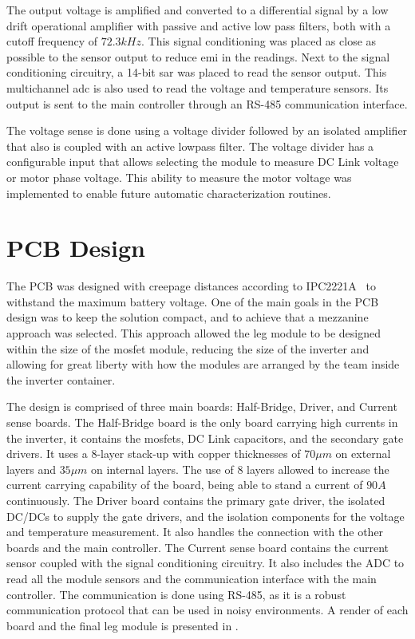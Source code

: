 The output voltage is amplified and converted to a differential signal by a low drift operational amplifier with passive and active low pass filters, both with a cutoff frequency of $72.3kHz$. This signal conditioning was placed as close as possible to the sensor output to reduce \gls{emi} in the readings. Next to the signal conditioning circuitry, a 14-bit \gls{sar} was placed to read the sensor output. This multichannel \gls{adc} is also used to read the voltage and temperature sensors. Its output is sent to the main controller through an RS-485 communication interface.

The voltage sense is done using a voltage divider followed by an isolated amplifier that also is coupled with an active lowpass filter. The voltage divider has a configurable input that allows selecting the module to measure DC Link voltage or motor phase voltage. This ability to measure the motor voltage was implemented to enable future automatic characterization routines.

\section{PCB Design}

The PCB was designed with creepage distances according to IPC2221A~\cite{IPC-2221:1998} to withstand the maximum battery voltage. One of the main goals in the PCB design was to keep the solution compact, and to achieve that a mezzanine approach was selected. This approach allowed the leg module to be designed within the size of the \gls{mosfet} module, reducing the size of the inverter and allowing for great liberty with how the modules are arranged by the team inside the inverter container. 

The design is comprised of three main boards: Half-Bridge, Driver, and Current sense boards. The Half-Bridge board is the only board carrying high currents in the inverter, it contains the \glspl{mosfet}, DC Link capacitors, and the secondary gate drivers. It uses a 8-layer stack-up with copper thicknesses of $70\mu m$ on external layers and $35\mu m$ on internal layers. The use of 8 layers allowed to increase the current carrying capability of the board, being able to stand a current of $90A$ continuously. The Driver board contains the primary gate driver, the isolated DC/DCs to supply the gate drivers, and the isolation components for the voltage and temperature measurement. It also handles the connection with the other boards and the main controller. The Current sense board contains the current sensor coupled with the signal conditioning circuitry. It also includes the ADC to read all the module sensors and the communication interface with the main controller. The communication is done using RS-485, as it is a robust communication protocol that can be used in noisy environments. A render of each board and the final leg module is presented in .

